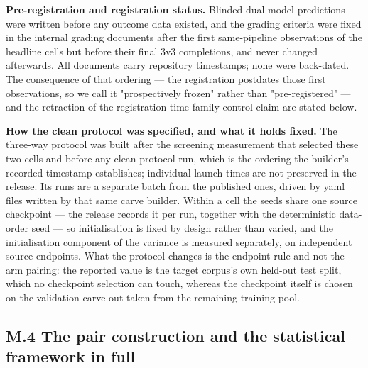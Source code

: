 \documentclass[pdflatex,sn-mathphys-ay]{sn-jnl}
\begin{document}
\textbf{Pre-registration and registration status.} Blinded dual-model predictions were written before any outcome data existed, and the grading criteria were fixed in the internal grading documents after the first same-pipeline observations of the headline cells but before their final 3v3 completions, and never changed afterwards. All documents carry repository timestamps; none were back-dated. The consequence of that ordering --- the registration postdates those first observations, so we call it "prospectively frozen" rather than "pre-registered" --- and the retraction of the registration-time family-control claim are stated below.

\textbf{How the clean protocol was specified, and what it holds fixed.} The three-way protocol was built after the screening measurement that selected these two cells and before any clean-protocol run, which is the ordering the builder's recorded timestamp establishes; individual launch times are not preserved in the release. Its runs are a separate batch from the published ones, driven by yaml files written by that same carve builder. Within a cell the seeds share one source checkpoint --- the release records it per run, together with the deterministic data-order seed --- so initialisation is fixed by design rather than varied, and the initialisation component of the variance is measured separately, on independent source endpoints. What the protocol changes is the endpoint rule and not the arm pairing: the reported value is the target corpus's own held-out test split, which no checkpoint selection can touch, whereas the checkpoint itself is chosen on the validation carve-out taken from the remaining training pool.

\subsection*{M.4 The pair construction and the statistical framework in full}
\end{document}
